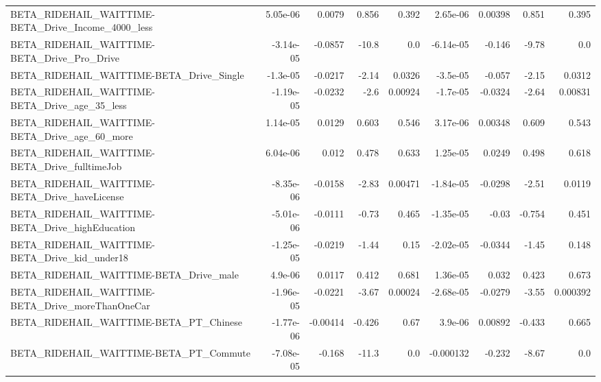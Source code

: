 \begin{tabular}{lrrrrrrrr}
BETA\_RIDEHAIL\_WAITTIME-BETA\_Drive\_Income\_4000\_less &    5.05e-06 &       0.0079 &     0.856 &    0.392 &   2.65e-06 &     0.00398 &        0.851 &         0.395 \\
BETA\_RIDEHAIL\_WAITTIME-BETA\_Drive\_Pro\_Drive        &   -3.14e-05 &      -0.0857 &     -10.8 &      0.0 &  -6.14e-05 &      -0.146 &        -9.78 &           0.0 \\
BETA\_RIDEHAIL\_WAITTIME-BETA\_Drive\_Single           &    -1.3e-05 &      -0.0217 &     -2.14 &   0.0326 &   -3.5e-05 &      -0.057 &        -2.15 &        0.0312 \\
BETA\_RIDEHAIL\_WAITTIME-BETA\_Drive\_age\_35\_less      &   -1.19e-05 &      -0.0232 &      -2.6 &  0.00924 &   -1.7e-05 &     -0.0324 &        -2.64 &       0.00831 \\
BETA\_RIDEHAIL\_WAITTIME-BETA\_Drive\_age\_60\_more      &    1.14e-05 &       0.0129 &     0.603 &    0.546 &   3.17e-06 &     0.00348 &        0.609 &         0.543 \\
BETA\_RIDEHAIL\_WAITTIME-BETA\_Drive\_fulltimeJob      &    6.04e-06 &        0.012 &     0.478 &    0.633 &   1.25e-05 &      0.0249 &        0.498 &         0.618 \\
BETA\_RIDEHAIL\_WAITTIME-BETA\_Drive\_haveLicense      &   -8.35e-06 &      -0.0158 &     -2.83 &  0.00471 &  -1.84e-05 &     -0.0298 &        -2.51 &        0.0119 \\
BETA\_RIDEHAIL\_WAITTIME-BETA\_Drive\_highEducation    &   -5.01e-06 &      -0.0111 &     -0.73 &    0.465 &  -1.35e-05 &       -0.03 &       -0.754 &         0.451 \\
BETA\_RIDEHAIL\_WAITTIME-BETA\_Drive\_kid\_under18      &   -1.25e-05 &      -0.0219 &     -1.44 &     0.15 &  -2.02e-05 &     -0.0344 &        -1.45 &         0.148 \\
BETA\_RIDEHAIL\_WAITTIME-BETA\_Drive\_male             &     4.9e-06 &       0.0117 &     0.412 &    0.681 &   1.36e-05 &       0.032 &        0.423 &         0.673 \\
BETA\_RIDEHAIL\_WAITTIME-BETA\_Drive\_moreThanOneCar   &   -1.96e-05 &      -0.0221 &     -3.67 &  0.00024 &  -2.68e-05 &     -0.0279 &        -3.55 &      0.000392 \\
BETA\_RIDEHAIL\_WAITTIME-BETA\_PT\_Chinese             &   -1.77e-06 &     -0.00414 &    -0.426 &     0.67 &    3.9e-06 &     0.00892 &       -0.433 &         0.665 \\
BETA\_RIDEHAIL\_WAITTIME-BETA\_PT\_Commute             &   -7.08e-05 &       -0.168 &     -11.3 &      0.0 &  -0.000132 &      -0.232 &        -8.67 &           0.0 \\

\end{tabular}
